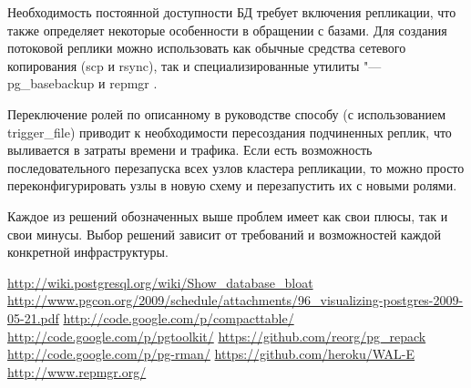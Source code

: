 \documentclass[10pt, a5paper]{article}
\begin{document}
Необходимость постоянной доступности БД требует включения репликации, что также определяет некоторые особенности в обращении с базами. 
Для создания потоковой реплики можно использовать как обычные средства сетевого копирования (scp и rsync), так и специализированные утилиты "--- pg\_basebackup и repmgr \cite{Bush8}.

Переключение ролей по описанному в руководстве способу (с использованием trigger\_file) приводит к необходимости пересоздания подчиненных реплик, что выливается в затраты времени и трафика. Если есть возможность последовательного перезапуска всех узлов кластера репликации, то можно просто переконфигурировать узлы в новую схему и перезапустить их с новыми ролями.

Каждое из решений обозначенных выше проблем имеет как свои плюсы, так и свои минусы. Выбор решений зависит от требований и возможностей каждой конкретной инфраструктуры.

\begin{thebibliography}{9}
\url{http://wiki.postgresql.org/wiki/Show\_database\_bloat}
\url{http://www.pgcon.org/2009/schedule/attachments/96\_visualizing-postgres-2009-05-21.pdf}
\url{http://code.google.com/p/compacttable/}
\url{http://code.google.com/p/pgtoolkit/}
\url{https://github.com/reorg/pg\_repack}
\url{http://code.google.com/p/pg-rman/}
\url{https://github.com/heroku/WAL-E}
\url{http://www.repmgr.org/}
\end{thebibliography}
\end{document}
